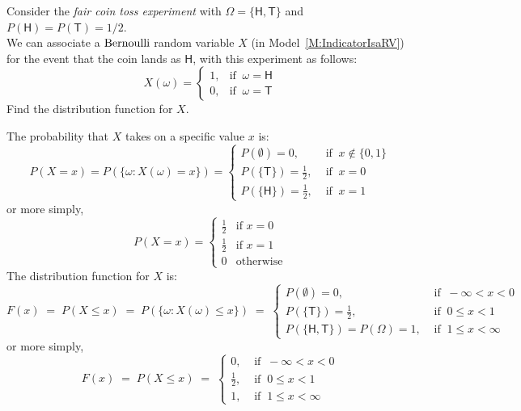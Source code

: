 \begin{Exercise}[title={Fair coin toss RV},label={xFairCoinRV}]
Consider the {\em fair coin toss experiment}  with $\Omega= \{ \mathsf{H},\mathsf{T} \}$ and $P(\mathsf{H}) = P(\mathsf{T})=1/2$. \\[6pt] We can associate a $\mbox{{\rm Bernoulli}}$ random variable $X$ (in Model~\ref{M:IndicatorIsaRV}) for the event that the coin lands as $\mathsf{H}$, with this experiment as follows:
\[X(\omega)=
\begin{cases}
1, & \text{if } \ \omega = \mathsf{H}\\
0, & \text{if } \ \omega = \mathsf{T}
\end{cases}
\]
Find the distribution function for $X$.
\end{Exercise}
\begin{Answer}
The probability that $X$ takes on a specific value $x$ is:
$$
P(X = x) = P(\{\omega: X(\omega) = x \}) =
\begin{cases}
P(\emptyset) = 0, & \text{ if } \  x \notin \{0,1\} \\
P(\{\mathsf{T} \}) =  \frac{1}{2}, & \text{ if } \  x = 0\\
P(\{ \mathsf{H}\}) = \frac{1}{2}, & \text{ if } \  x = 1
\end{cases}
$$
or more simply,
\[
P(X=x)=
\begin{cases}
\frac{1}{2} & \text{if } x=0\\
\frac{1}{2} & \text{if } x=1\\
0 & \text{otherwise}
\end{cases}
\]
The distribution function for $X$ is:
$$
F(x) \;=\; P(X \leq x) \;=\; P(\{\omega: X(\omega) \leq x \})\; =\;
\begin{cases}
P(\emptyset) = 0, & \text{ if } \ -\infty < x < 0\\
P(\{\mathsf{T} \}) =  \frac{1}{2}, & \text{ if } \ 0 \leq x < 1\\
P(\{ \mathsf{H} , \mathsf{T} \}) = P(\Omega)  = 1,
& \text{ if } \ 1 \leq x < \infty
\end{cases}
$$
or more simply, $$
F(x)\; = \;P(X \leq x) \;=\;
\begin{cases}
 0, & \text{ if } \ -\infty < x < 0\\
 \frac{1}{2}, & \text{ if } \ 0 \leq x < 1\\
 1,
& \text{ if } \ 1 \leq x < \infty
\end{cases}
$$
\end{Answer}

